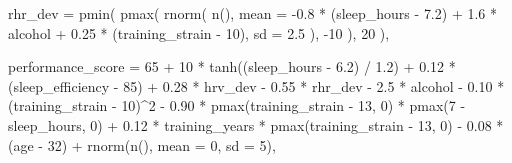 \documentclass[
  letterpaper,
  DIV=11,
  numbers=noendperiod]{scrreprt}
\newenvironment{Shaded}{\begin{snugshade}}{\end{snugshade}}
\newcommand{\AttributeTok}[1]{\textcolor[rgb]{0.40,0.45,0.13}{#1}}
\newcommand{\DecValTok}[1]{\textcolor[rgb]{0.68,0.00,0.00}{#1}}
\newcommand{\FloatTok}[1]{\textcolor[rgb]{0.68,0.00,0.00}{#1}}
\newcommand{\FunctionTok}[1]{\textcolor[rgb]{0.28,0.35,0.67}{#1}}
\newcommand{\NormalTok}[1]{\textcolor[rgb]{0.00,0.23,0.31}{#1}}
\newcommand{\SpecialCharTok}[1]{\textcolor[rgb]{0.37,0.37,0.37}{#1}}
\begin{document}
\begin{Shaded}
\begin{Highlighting}[]
      \AttributeTok{rhr\_dev =} \FunctionTok{pmin}\NormalTok{(}
        \FunctionTok{pmax}\NormalTok{(}
          \FunctionTok{rnorm}\NormalTok{(}
            \FunctionTok{n}\NormalTok{(),}
            \AttributeTok{mean =} \SpecialCharTok{{-}}\FloatTok{0.8} \SpecialCharTok{*}\NormalTok{ (sleep\_hours }\SpecialCharTok{{-}} \FloatTok{7.2}\NormalTok{) }\SpecialCharTok{+}
              \FloatTok{1.6} \SpecialCharTok{*}\NormalTok{ alcohol }\SpecialCharTok{+}
              \FloatTok{0.25} \SpecialCharTok{*}\NormalTok{ (training\_strain }\SpecialCharTok{{-}} \DecValTok{10}\NormalTok{),}
            \AttributeTok{sd =} \FloatTok{2.5}
\NormalTok{          ),}
          \SpecialCharTok{{-}}\DecValTok{10}
\NormalTok{        ),}
        \DecValTok{20}
\NormalTok{      ),}

      \AttributeTok{performance\_score =}
        \DecValTok{65} \SpecialCharTok{+}
        \DecValTok{10} \SpecialCharTok{*} \FunctionTok{tanh}\NormalTok{((sleep\_hours }\SpecialCharTok{{-}} \FloatTok{6.2}\NormalTok{) }\SpecialCharTok{/} \FloatTok{1.2}\NormalTok{) }\SpecialCharTok{+}
        \FloatTok{0.12} \SpecialCharTok{*}\NormalTok{ (sleep\_efficiency }\SpecialCharTok{{-}} \DecValTok{85}\NormalTok{) }\SpecialCharTok{+}
        \FloatTok{0.28} \SpecialCharTok{*}\NormalTok{ hrv\_dev }\SpecialCharTok{{-}}
        \FloatTok{0.55} \SpecialCharTok{*}\NormalTok{ rhr\_dev }\SpecialCharTok{{-}}
        \FloatTok{2.5} \SpecialCharTok{*}\NormalTok{ alcohol }\SpecialCharTok{{-}}
        \FloatTok{0.10} \SpecialCharTok{*}\NormalTok{ (training\_strain }\SpecialCharTok{{-}} \DecValTok{10}\NormalTok{)}\SpecialCharTok{\^{}}\DecValTok{2} \SpecialCharTok{{-}}
        \FloatTok{0.90} \SpecialCharTok{*}
          \FunctionTok{pmax}\NormalTok{(training\_strain }\SpecialCharTok{{-}} \DecValTok{13}\NormalTok{, }\DecValTok{0}\NormalTok{) }\SpecialCharTok{*}
          \FunctionTok{pmax}\NormalTok{(}\DecValTok{7} \SpecialCharTok{{-}}\NormalTok{ sleep\_hours, }\DecValTok{0}\NormalTok{) }\SpecialCharTok{+}
        \FloatTok{0.12} \SpecialCharTok{*}
\NormalTok{          training\_years }\SpecialCharTok{*}
          \FunctionTok{pmax}\NormalTok{(training\_strain }\SpecialCharTok{{-}} \DecValTok{13}\NormalTok{, }\DecValTok{0}\NormalTok{) }\SpecialCharTok{{-}}
        \FloatTok{0.08} \SpecialCharTok{*}\NormalTok{ (age }\SpecialCharTok{{-}} \DecValTok{32}\NormalTok{) }\SpecialCharTok{+}
        \FunctionTok{rnorm}\NormalTok{(}\FunctionTok{n}\NormalTok{(), }\AttributeTok{mean =} \DecValTok{0}\NormalTok{, }\AttributeTok{sd =} \DecValTok{5}\NormalTok{),}


\end{Highlighting}
\end{Shaded}
\end{document}
